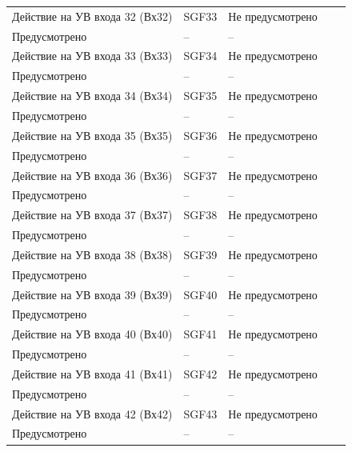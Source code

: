\begin{longtable}{|>{\centering\arraybackslash}m{5.3cm}|>{\centering\arraybackslash}m{3.3cm}|>{\centering\arraybackslash}m{4.2cm}|>{\centering\arraybackslash}m{1.8cm}|>{\centering\arraybackslash}m{1cm}|}
\hline
\centering Действие на УВ входа 32 (Вх32)  & \centering SGF33 & \centering Не предусмотрено \\ Предусмотрено & \centering -- & \centering \arraybackslash -- \\
\hline
\centering Действие на УВ входа 33 (Вх33)  & \centering SGF34 & \centering Не предусмотрено \\ Предусмотрено & \centering -- & \centering \arraybackslash -- \\
\hline
\centering Действие на УВ входа 34 (Вх34)  & \centering SGF35 & \centering Не предусмотрено \\ Предусмотрено & \centering -- & \centering \arraybackslash -- \\
\hline
\centering Действие на УВ входа 35 (Вх35)  & \centering SGF36 & \centering Не предусмотрено \\ Предусмотрено & \centering -- & \centering \arraybackslash -- \\
\hline
\centering Действие на УВ входа 36 (Вх36)  & \centering SGF37 & \centering Не предусмотрено \\ Предусмотрено & \centering -- & \centering \arraybackslash -- \\
\hline
\centering Действие на УВ входа 37 (Вх37)  & \centering SGF38 & \centering Не предусмотрено \\ Предусмотрено & \centering -- & \centering \arraybackslash -- \\
\hline
\centering Действие на УВ входа 38 (Вх38)  & \centering SGF39 & \centering Не предусмотрено \\ Предусмотрено & \centering -- & \centering \arraybackslash -- \\
\hline
\centering Действие на УВ входа 39 (Вх39)  & \centering SGF40 & \centering Не предусмотрено \\ Предусмотрено & \centering -- & \centering \arraybackslash -- \\
\hline
\centering Действие на УВ входа 40 (Вх40)  & \centering SGF41 & \centering Не предусмотрено \\ Предусмотрено & \centering -- & \centering \arraybackslash -- \\
\hline
\centering Действие на УВ входа 41 (Вх41)  & \centering SGF42 & \centering Не предусмотрено \\ Предусмотрено & \centering -- & \centering \arraybackslash -- \\
\hline
\centering Действие на УВ входа 42 (Вх42)  & \centering SGF43 & \centering Не предусмотрено \\ Предусмотрено & \centering -- & \centering \arraybackslash -- \\

\end{longtable}
